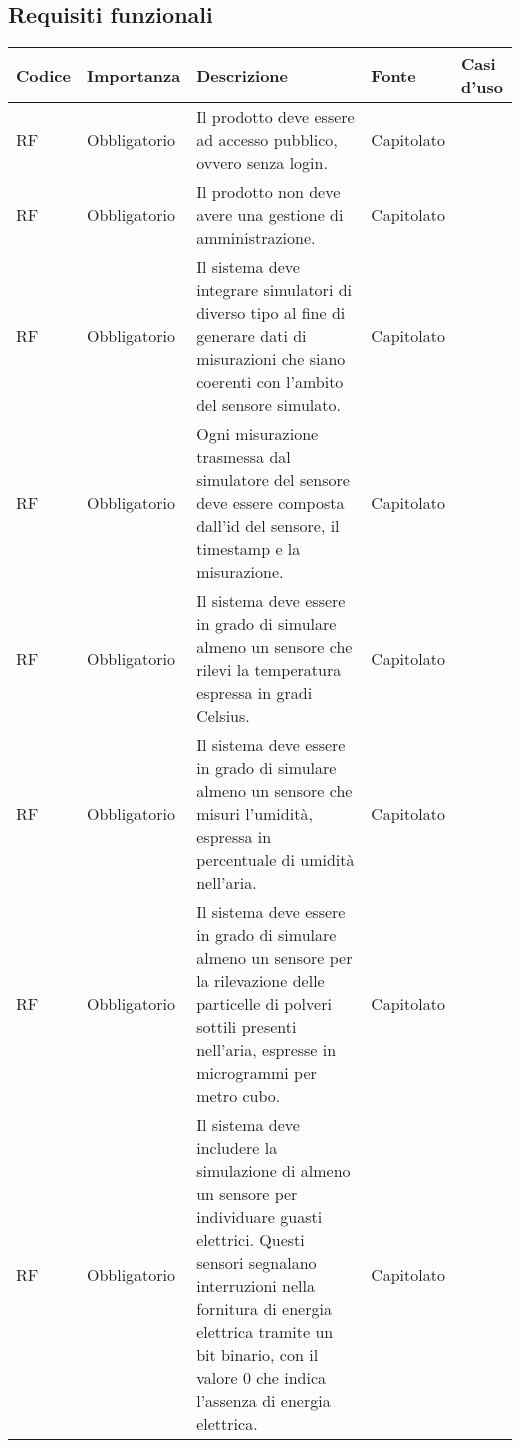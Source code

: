 \subsection{Requisiti funzionali}

\begin{longtable}{|C{1cm}|C{2cm}|>{\raggedright}m{5cm}|C{2cm}|C{1.5cm}|}
    \hline
    \textbf{Codice} & \textbf{Importanza} & \textbf{Descrizione} & \textbf{Fonte}  & \textbf{Casi d'uso} \\

    \hline
    RF & Obbligatorio & Il prodotto deve essere ad accesso pubblico, ovvero senza login. & Capitolato & \\

    \hline
     RF & Obbligatorio & Il prodotto non deve avere una gestione di amministrazione. & Capitolato & \\

    \hline
     RF & Obbligatorio & Il sistema deve integrare simulatori di diverso tipo al fine di generare dati di misurazioni che siano coerenti con l'ambito del sensore simulato. & Capitolato & \\

    \hline
     RF & Obbligatorio & Ogni misurazione trasmessa dal simulatore del sensore deve essere composta dall'id del sensore, il timestamp e la misurazione. & Capitolato & \\

    \hline
     RF & Obbligatorio &  Il sistema deve essere in grado di simulare almeno un sensore che rilevi la temperatura espressa in gradi Celsius. & Capitolato &  \\

    \hline
     RF & Obbligatorio &  Il sistema deve essere in grado di simulare almeno un sensore che misuri l'umidità, espressa in percentuale di umidità nell'aria. & Capitolato &  \\

    \hline
     RF & Obbligatorio &  Il sistema deve essere in grado di simulare almeno un sensore per la rilevazione delle particelle di polveri sottili presenti nell'aria, espresse in microgrammi per metro cubo. & Capitolato & \\

    \hline
     RF & Obbligatorio &  Il sistema deve includere la simulazione di almeno un sensore per individuare guasti elettrici. Questi sensori segnalano interruzioni nella fornitura di energia elettrica tramite un bit binario, con il valore 0 che indica l'assenza di energia elettrica. & Capitolato & \\
    

\end{longtable}
